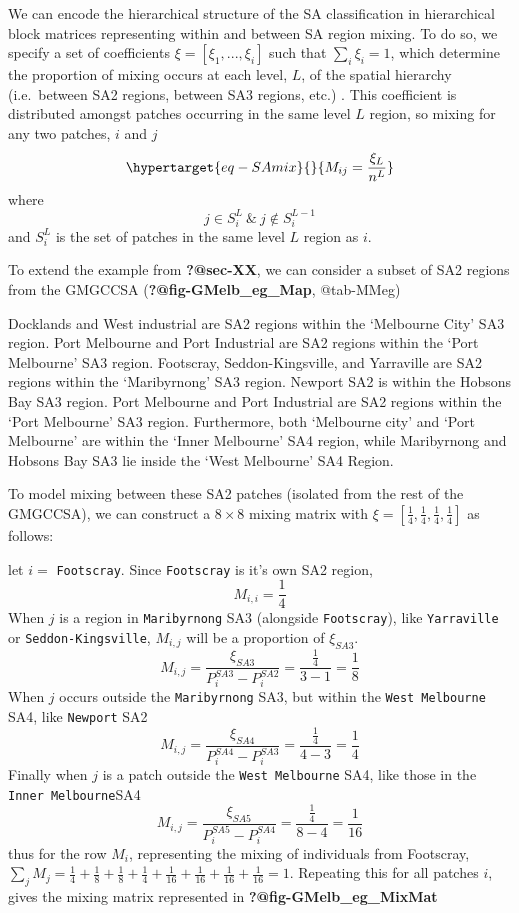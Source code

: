 \documentclass[
  letterpaper,
  DIV=11,
  numbers=noendperiod]{scrartcl}
\begin{document}
We can encode the hierarchical structure of the SA classification in
hierarchical block matrices representing within and between SA region
mixing. To do so, we specify a set of coefficients
\(\xi = [\xi_1, ..., \xi_i]\) such that \(\sum\limits_{i}\xi_{i}=1\),
which determine the proportion of mixing occurs at each level, \(L\), of
the spatial hierarchy (i.e.~between SA2 regions, between SA3 regions,
etc.) . This coefficient is distributed amongst patches occurring in the
same level \(L\) region, so mixing for any two patches, \(i\) and \(j\)
\begin{equation}\protect\hypertarget{eq-SAmix}{}{
M_{ij}= \frac{\xi_{L}}{n^{L}} 
}\label{eq-SAmix}\end{equation} where \[
j \in S_{i}^{L} \  \& \ j \notin S_{i}^{L-1}
\] and \(S_{i}^{L}\) is the set of patches in the same level \(L\)
region as \(i\).

To extend the example from \textbf{?@sec-XX}, we can consider a subset
of SA2 regions from the GMGCCSA (\textbf{?@fig-GMelb\_eg\_Map},
@tab-MMeg)

Docklands and West industrial are SA2 regions within the `Melbourne
City' SA3 region. Port Melbourne and Port Industrial are SA2 regions
within the `Port Melbourne' SA3 region. Footscray, Seddon-Kingsville,
and Yarraville are SA2 regions within the `Maribyrnong' SA3 region.
Newport SA2 is within the Hobsons Bay SA3 region. Port Melbourne and
Port Industrial are SA2 regions within the `Port Melbourne' SA3 region.
Furthermore, both `Melbourne city' and `Port Melbourne' are within the
`Inner Melbourne' SA4 region, while Maribyrnong and Hobsons Bay SA3 lie
inside the `West Melbourne' SA4 Region.

To model mixing between these SA2 patches (isolated from the rest of the
GMGCCSA), we can construct a \(8 \times 8\) mixing matrix with
\(\xi = \left[ \frac{1}{4}, \frac{1}{4},\frac{1}{4},\frac{1}{4} \right]\)
as follows:

let \(i =\) \texttt{Footscray}. Since \texttt{Footscray} is it's own SA2
region, \[M_{i,i} = \frac{1}{4}\] When \(j\) is a region in
\texttt{Maribyrnong} SA3 (alongside \texttt{Footscray}), like
\texttt{Yarraville} or \texttt{Seddon-Kingsville}, \(M_{i,j}\) will be a
proportion of \(\xi_{SA3}\). \[
M_{i,j} = \frac{\xi_{SA3}}{P_{i}^{SA3} - P_{i}^{SA2}} = \frac{\frac{1}{4}}{3 - 1} = \frac{1}{8}
\] When \(j\) occurs outside the \texttt{Maribyrnong} SA3, but within
the \texttt{West\ Melbourne} SA4, like \texttt{Newport} SA2 \[
M_{i,j} = \frac{\xi_{SA4}}{P_{i}^{SA4} - P_{i}^{SA3}} = \frac{\frac{1}{4}}{4 - 3} = \frac{1}{4}
\] Finally when \(j\) is a patch outside the \texttt{West\ Melbourne}
SA4, like those in the \texttt{Inner\ Melbourne}SA4 \[
M_{i,j} = \frac{\xi_{SA5}}{P_{i}^{SA5} - P_{i}^{SA4}} = \frac{\frac{1}{4}}{8 - 4} = \frac{1}{16}
\] thus for the row \(M_{i}\), representing the mixing of individuals
from Footscray,
\(\sum\limits_{j}M_{j}= \frac{1}{4} +\frac{1}{8} + \frac{1}{8} + \frac{1}{4} + \frac{1}{16} + \frac{1}{16} + \frac{1}{16} + \frac{1}{16} = 1\).
Repeating this for all patches \(i\), gives the mixing matrix
represented in \textbf{?@fig-GMelb\_eg\_MixMat}
\end{document}
